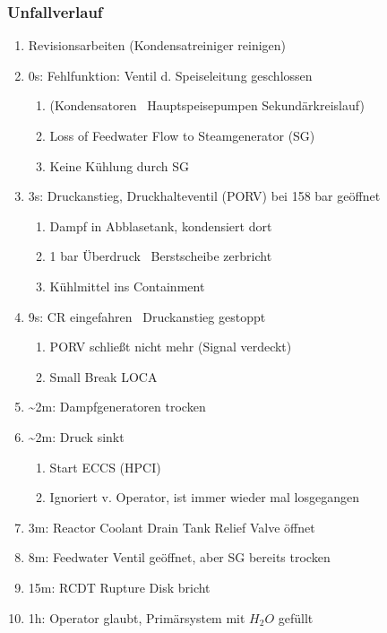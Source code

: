 \documentclass[12pt]{article}
\begin{document}
\subsubsection{Unfallverlauf}
\begin{enumerate}
  \item Revisionsarbeiten (Kondensatreiniger reinigen)
  \item 0s: Fehlfunktion: Ventil d. Speiseleitung geschlossen
  \begin{enumerate}[label = \textrightarrow]
    \item (Kondensatoren \textrightarrow\ Hauptspeisepumpen Sekundärkreislauf)
    \item Loss of Feedwater Flow to Steamgenerator (SG)
    \item Keine Kühlung durch SG
  \end{enumerate}
  \item 3s: Druckanstieg, Druckhalteventil (PORV) bei 158 bar geöffnet
  \begin{enumerate}[label = \textrightarrow]
    \item Dampf in Abblasetank, kondensiert dort
    \item 1 bar Überdruck \textrightarrow\ Berstscheibe zerbricht
    \item Kühlmittel ins Containment
  \end{enumerate}
  \item 9s: CR eingefahren \textrightarrow\ Druckanstieg gestoppt
  \begin{enumerate}[label = \textrightarrow]
    \item PORV schließt nicht mehr (Signal verdeckt)
    \item Small Break LOCA
  \end{enumerate}
  \item \textasciitilde 2m: Dampfgeneratoren trocken
  \item \textasciitilde 2m: Druck sinkt
  \begin{enumerate}[label = \textrightarrow]
    \item Start ECCS (HPCI)
    \item Ignoriert v. Operator, ist immer wieder mal losgegangen
  \end{enumerate}
  \item 3m: Reactor Coolant Drain Tank Relief Valve öffnet
  \item 8m: Feedwater Ventil geöffnet, aber SG bereits trocken
  \item 15m: RCDT Rupture Disk bricht
  \item 1h: Operator glaubt, Primärsystem mit \(H_2O\) gefüllt

\end{enumerate}
\end{document}
